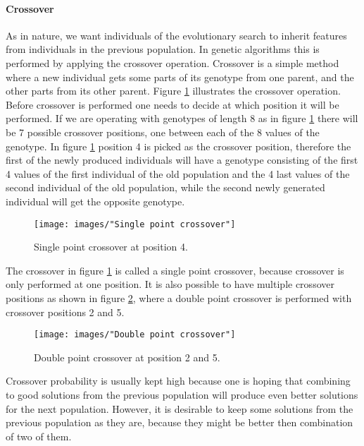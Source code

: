 \documentclass{article}
\begin{document}
\paragraph{Crossover}
As in nature, we want individuals of the evolutionary search to inherit features from individuals in the previous population. In genetic algorithms this is performed by applying the crossover operation. Crossover is a simple method where a new individual gets some parts of its genotype from one parent, and the other parts from its other parent. Figure \ref{Single point crossover} illustrates the crossover operation. Before crossover is performed one needs to decide at which position it will be performed. If we are operating with genotypes of length 8 as in figure \ref{Single point crossover} there will be 7 possible crossover positions, one between each of the 8 values of the genotype. In figure \ref{Single point crossover} position 4 is picked as the crossover position, therefore the first of the newly produced individuals will have a genotype consisting of the first 4 values of the first individual of the old population and the 4 last values of the second individual of the old population, while the second newly generated individual will get the opposite genotype.


\begin{figure}[h!]
\begin{center}
\texttt{[image: images/"Single point crossover"]}
\caption{Single point crossover at position 4.}
\label{Single point crossover}
\end{center}
\end{figure}


\noindent The crossover in figure \ref{Single point crossover} is called a single point crossover, because crossover is only performed at one position. It is also possible to have multiple crossover positions as shown in figure \ref{Double point crossover}, where a double point crossover is performed with crossover positions 2 and 5.


\begin{figure}[h!]
\begin{center}
\texttt{[image: images/"Double point crossover"]}
\caption{Double point crossover at position 2 and 5.}
\label{Double point crossover}
\end{center}
\end{figure}


\noindent Crossover probability is usually kept high because one is hoping that combining to good solutions from the previous population will produce even better solutions for the next population. However, it is desirable to keep some solutions from the previous population as they are, because they might be better then combination of two of them. \\
\end{document}
